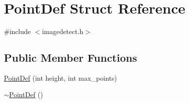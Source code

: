 \hypertarget{struct_point_def}{}\section{Point\+Def Struct Reference}
\label{struct_point_def}


{\ttfamily \#include $<$imagedetect.\+h$>$}

\subsection*{Public Member Functions}
\begin{DoxyCompactItemize}
\item 
\mbox{\hyperlink{struct_point_def_ade8be8c08d02c0f3e51c274b6b705d84}{Point\+Def}} (int height, int max\+\_\+points)
\item 
\mbox{\hyperlink{struct_point_def_a31c4cea9c80b3b5da0f25ad0764b0e89}{$\sim$\+Point\+Def}} ()
\end{DoxyCompactItemize}
